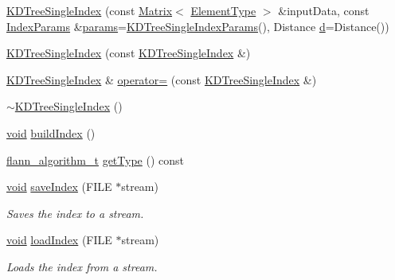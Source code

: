 \begin{DoxyCompactItemize}
\item 
\hyperlink{classcvflann_1_1KDTreeSingleIndex_a08512e3697cf135110f190b376e40cd3}{K\-D\-Tree\-Single\-Index} (const \hyperlink{classcvflann_1_1Matrix}{Matrix}$<$ \hyperlink{classcvflann_1_1KDTreeSingleIndex_a3b7bf5e05057a76d1b7eee693062784e}{Element\-Type} $>$ \&input\-Data, const \hyperlink{namespacecvflann_a742b4c7076c21012054af74a9ee48289}{Index\-Params} \&\hyperlink{compat_8hpp_a0480a03ecc41b20cde376602531d9270}{params}=\hyperlink{structcvflann_1_1KDTreeSingleIndexParams}{K\-D\-Tree\-Single\-Index\-Params}(), Distance \hyperlink{legacy_8hpp_a6f364afbe132c4ecfea48bde1b0618ba}{d}=Distance())
\item 
\hyperlink{classcvflann_1_1KDTreeSingleIndex_a8c1fa6af816722e07977bf3acf0a1107}{K\-D\-Tree\-Single\-Index} (const \hyperlink{classcvflann_1_1KDTreeSingleIndex}{K\-D\-Tree\-Single\-Index} \&)
\item 
\hyperlink{classcvflann_1_1KDTreeSingleIndex}{K\-D\-Tree\-Single\-Index} \& \hyperlink{classcvflann_1_1KDTreeSingleIndex_ad36b97f782f485ae991a01816839073b}{operator=} (const \hyperlink{classcvflann_1_1KDTreeSingleIndex}{K\-D\-Tree\-Single\-Index} \&)
\item 
\hyperlink{classcvflann_1_1KDTreeSingleIndex_a9f4c82ef64eb57eff3d03d0d5c08bac6}{$\sim$\-K\-D\-Tree\-Single\-Index} ()
\item 
\hyperlink{legacy_8hpp_a8bb47f092d473522721002c86c13b94e}{void} \hyperlink{classcvflann_1_1KDTreeSingleIndex_ab3f54bfaa6c99b1e5116b35d5f370227}{build\-Index} ()
\item 
\hyperlink{namespacecvflann_a4e3e6c98d774ea77fd7f0045c9bc7817}{flann\-\_\-algorithm\-\_\-t} \hyperlink{classcvflann_1_1KDTreeSingleIndex_a562c049eeaf138b5bc9ead6129ff41e9}{get\-Type} () const 
\item 
\hyperlink{legacy_8hpp_a8bb47f092d473522721002c86c13b94e}{void} \hyperlink{classcvflann_1_1KDTreeSingleIndex_adacba07ebbd7ed471f2645b64bb883e5}{save\-Index} (F\-I\-L\-E $\ast$stream)
\begin{DoxyCompactList}\small\item\em Saves the index to a stream. \end{DoxyCompactList}\item 
\hyperlink{legacy_8hpp_a8bb47f092d473522721002c86c13b94e}{void} \hyperlink{classcvflann_1_1KDTreeSingleIndex_ab895fb2728fdd040790b8278e18a2fb7}{load\-Index} (F\-I\-L\-E $\ast$stream)
\begin{DoxyCompactList}\small\item\em Loads the index from a stream. \end{DoxyCompactList}\item 

\end{DoxyCompactItemize}
